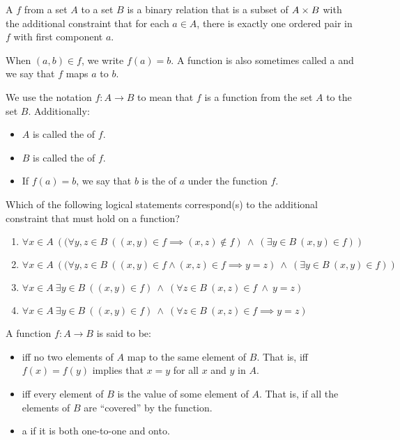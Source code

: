 \begin{defn}[Functions]
A  $f$ from a set $A$ to a set $B$ is a binary relation that is a subset of $A \times B$ with the additional constraint that for each $a \in A$, there is exactly one ordered pair in $f$ with first component $a$.

When $(a, b) \in f$, we write $f(a) = b$. A function is also sometimes called a  and we say that $f$ maps $a$ to $b$.

We use the notation $f : A \to B$ to mean that $f$ is a function from the set $A$ to the set $B$. Additionally:
\begin{itemize}
\item $A$ is called the  of $f$.
\item $B$ is called the  of $f$.
\item If $f(a) = b$, we say that $b$ is the  of $a$ under the function $f$.
\end{itemize}
\end{defn}

\begin{exer}
Which of the following logical statements correspond(s) to the additional constraint that must hold on a function?
\begin{enumerate}[label=(\alph*)]
\item $\forall x \in A\ \left(
		(\forall y, z \in B\ ((x, y) \in f \implies (x, z) \notin f) 
		\ \land\ (\exists y \in B\ (x, y) \in f )
		\right)$
\item $\forall x \in A\  \left(
		(\forall y, z \in B\ ((x, y) \in f \wedge (x, z) \in f \implies y = z) 
		\ \land\ (\exists y \in B\ (x, y) \in f )
		\right)$
\item $\forall x \in A\ \exists y \in B\ 
		((x, y) \in f) \ \land\  (\forall z \in B\ (x, z) \in f \ \land\ y = z )  $
\item $\forall x \in A\ \exists y \in B\ 
		((x, y) \in f) \ \land\  (\forall z \in B\  (x, z) \in f \implies y = z )  $
\end{enumerate}
\end{exer}

\begin{defn}
A function $f : A \to B$ is said to be:
\begin{itemize}
\item {} iff no two elements of $A$ map to the same element of $B$. That is, iff $f(x) = f(y)$ implies that $x = y$ for all $x$ and $y$ in $A$.
\item {} iff every element of $B$ is the value of some element of $A$. That is, if all the elements of $B$ are ``covered'' by the function. 
\item a \defterm{bijection} if it is both one-to-one and onto.
\end{itemize}
\end{defn}

